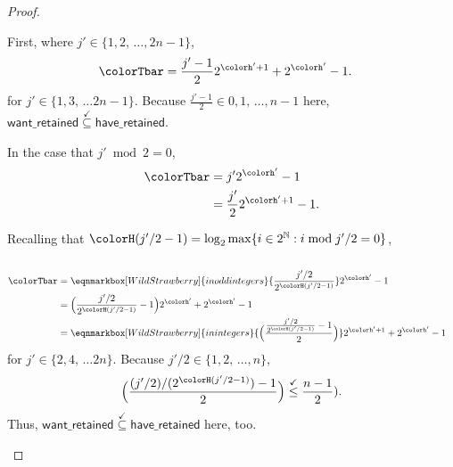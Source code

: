 \begin{proof}
\begin{proofpart}
First, where $j' \in \{1,2,\,\ldots,2n-1\}$,
\begin{align*}
\colorTbar
&= \frac{j'-1}{2} 2^{\colorh' + 1} + 2^{\colorh'} - 1.
\end{align*}
for $j' \in \{1, 3, \,\ldots 2n-1\}$.
Because $\frac{j'-1}{2} \in 0, 1, \, \ldots, n - 1$ here, $\mathsf{want\_retained} \stackrel{\checkmark}{\subseteq} \mathsf{have\_retained}$.

In the case that $j' \bmod 2 = 0$,
\begin{align*}
\colorTbar
&= j'2^{\colorh'} - 1\\
&= \frac{j'}{2}2^{\colorh' + 1} - 1.
\end{align*}

Recalling that $\colorH(j'/2 - 1) = \log_2 \max\{ i \in 2^{\mathbb{N}} : i \bmod j'/2 = 0 \}$,
\begin{align*}
\\
\colorTbar
&=
\eqnmarkbox[WildStrawberry]{inoddintegers}{
  \frac{j'/2}{2^{\colorH(j'/2 - 1)}}
}
2^{\colorh'} - 1\\
&= \Big(\frac{j'/2}{2^{\colorH(j'/2 - 1)}} - 1\Big) 2^{\colorh'} + 2^{\colorh'} - 1\\
&=
\eqnmarkbox[WildStrawberry]{inintegers}{\Big(
  \frac{
    \frac{j'/2}{2^{\colorH(j'/2 - 1)}} - 1
  }{2}
\Big)}
2^{\colorh' + 1} + 2^{\colorh'} - 1
\\
\end{align*}
for $j' \in \{2, 4, \,\ldots 2n\}$.
Because $j'/2 \in \{1, 2, \, \ldots, n\}$,
\begin{align*}
\Big(\frac{(j'/2)/(2^{\colorH(j'/2 - 1)}) - 1}{2}\Big)
\stackrel{\checkmark}{\leq} \frac{n - 1}{2}).
\end{align*}
Thus, $\mathsf{want\_retained} \stackrel{\checkmark}{\subseteq} \mathsf{have\_retained}$ here, too.
\end{proofpart}
\end{proof}
